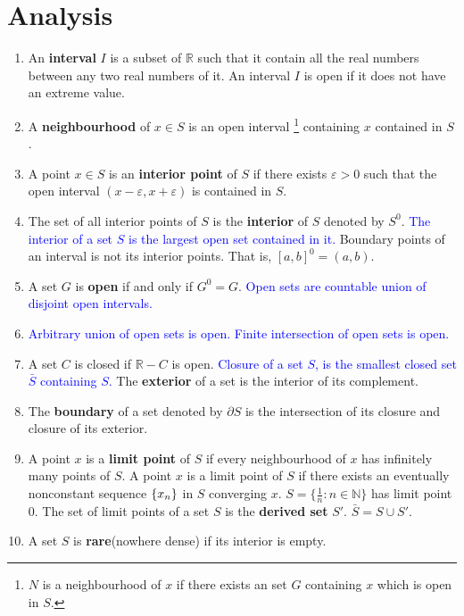 \section{Analysis}
\begin{enumerate}
	\item An \textbf{interval} $I$ is a subset of $\mathbb{R}$ such that it contain all the real numbers between any two real numbers of it.
		\subitem An interval $I$ is open if it does not have an extreme value.
	\item A \textbf{neighbourhood} of $x \in S$ is an open interval \footnote{$N$ is a neighbourhood of $x$ if there exists an set $G$ containing $x$ which is open in $S$.} containing $x$ contained in $S$.
	\item A point $x \in S$ is an \textbf{interior point} of $S$ if there exists $\varepsilon > 0$ such that the open interval $(x-\varepsilon, x+\varepsilon)$ is contained in $S$.
	\item The set of all interior points of $S$ is the \textbf{interior} of $S$ denoted by $S^0$. 
		\subitem \textcolor{blue}{The interior of a set $S$ is the largest open set contained in it.}
		\subitem Boundary points of an interval is not its interior points. That is, $[a,b]^0 = (a,b)$.
	\item A set $G$ is \textbf{open} if and only if $G^0 = G$.
		\subitem \textcolor{blue}{Open sets are countable union of disjoint open intervals.}
	\item \textcolor{blue}{Arbitrary union of open sets is open. Finite intersection of open sets is open.}
	\item A set $C$ is closed if $\mathbb{R}-C$ is open.
		\subitem \textcolor{blue}{Closure of a set $S$, is the smallest closed set $\bar{S}$ containing $S$.}
		\subitem The \textbf{exterior} of a set is the interior of its complement.
	\item The \textbf{boundary} of a set denoted by $\partial S$ is the intersection of its closure and closure of its exterior.
	\item A point $x$ is a \textbf{limit point} of $S$ if every neighbourhood of $x$ has infinitely many points of $S$.
		\subitem A point $x$ is a limit point of $S$ if there exists an eventually nonconstant sequence $\{x_n\}$ in $S$ converging $x$.
		\subitem $S = \{ \frac{1}{n} : n \in \mathbb{N} \}$ has limit point $0$.
		\subitem The set of limit points of a set $S$ is the \textbf{derived set} $S'$.
		\subitem $\bar{S} = S \cup S'$.
	\item A set $S$ is \textbf{rare}(nowhere dense) if its interior is empty.\\

\end{enumerate}
